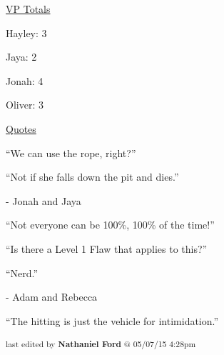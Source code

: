 \underline{  {\LARGE VP Totals }  }



Hayley: 3

Jaya: 2

Jonah: 4

Oliver: 3



\underline{  {\LARGE Quotes }  }



``We can use the rope, right?''

``Not if she falls down the pit and dies.''

                        - Jonah and Jaya



``Not everyone can be 100\%, 100\% of the time!''




``Is there a Level 1 Flaw that applies to this?''

``Nerd.''

                        - Adam and Rebecca



``The hitting is just the vehicle for intimidation.''



\iffalse

======================
THESE ARE ERRORS ENCOUNTERED DURING THE EXPORT PROCESS
======================

	Unable to highlight for footnote: What was the name of the Threat? because:GivenExpected12 Tokens enter the threat pool12 Tokens enter the Pool

	Unable to highlight for footnote: It's more like "Wait, what, _tests_, they made you take _tests_?" but not coherently enough due to be clear due to the pain and time pressure. because:GivenExpectedJonah asks what she means by “testsJonah asks what tests


\fi

\vspace{\fill}

\begin{flushright}
\textsubscript{last edited by \textbf{Nathaniel Ford} @ 05/07/15 4:28pm}
\end{flushright}

